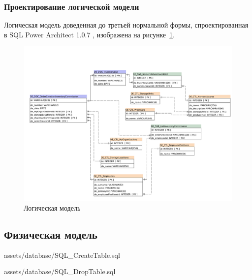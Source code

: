 \subsubsection{Проектирование логической модели}

Логическая модель доведенная до третьей нормальной формы,
спроектированная в SQL Power Architect 1.0.7 \cite{SqlPowerArhitect},
изображена на рисунке~\ref{fig:ArchitectureDatabase}.

\begin{figure}[!h]
    \centering

    \includegraphics[width=17cm]
    {assets/database/LogicModel.SqlPowerArchitect.architect.pdf}

    \caption{Логическая модель}

    \label{fig:ArchitectureDatabase}
\end{figure}

\newpage
\subsection{Физическая модель}


{assets/database/SQL_CreateTable.sql}

\newpage


{assets/database/SQL_DropTable.sql}

\newpage
